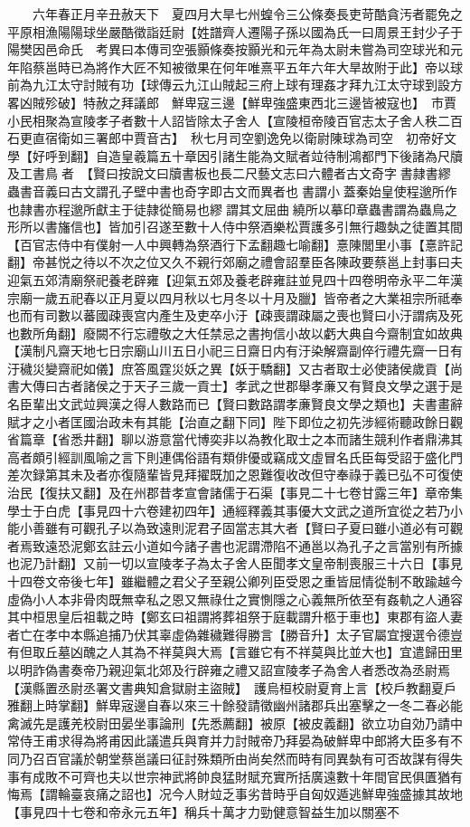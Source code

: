 　　六年春正月辛丑赦天下　夏四月大旱七州蝗令三公條奏長吏苛酷貪汚者罷免之平原相漁陽陽球坐嚴酷徵詣廷尉【姓譜齊人遷陽子孫以國為氏一曰周景王封少子于陽樊因邑命氏　考異曰本傳司空張顥條奏按顥光和元年為太尉未嘗為司空球光和元年陷蔡邕時已為將作大匠不知被徵果在何年唯熹平五年六年大旱故附于此】帝以球前為九江太守討賊有功【球傳云九江山賊起三府上球有理姦才拜九江太守球到設方畧凶賊殄破】特赦之拜議郎　鮮卑寇三邊【鮮卑強盛東西北三邊皆被寇也】　市賈小民相聚為宣陵孝子者數十人詔皆除太子舍人【宣陵桓帝陵百官志太子舍人秩二百石更直宿衛如三署郎中賈音古】　秋七月司空劉逸免以衛尉陳球為司空　初帝好文學【好呼到翻】自造皇羲篇五十章因引諸生能為文賦者竝待制鴻都門下後諸為尺牘及工書鳥者　【賢曰按說文曰牘書板也長二尺藝文志曰六體者古文奇字書隷書繆蟲書音義曰古文謂孔子壁中書也奇字即古文而異者也書謂小蓋秦始皇使程邈所作也隷書亦程邈所獻主于徒隷從簡易也繆謂其文屈曲繞所以摹印章蟲書謂為蟲鳥之形所以書旛信也】皆加引召遂至數十人侍中祭酒樂松賈護多引無行趣埶之徒置其間【百官志侍中有僕射一人中興轉為祭酒行下孟翻趣七喻翻】憙陳閭里小事【憙許記翻】帝甚悦之待以不次之位又久不親行郊廟之禮會詔羣臣各陳政要蔡邕上封事曰夫迎氣五郊清廟祭祀養老辟雍【迎氣五郊及養老辟雍註並見四十四卷明帝永平二年漢宗廟一歲五祀春以正月夏以四月秋以七月冬以十月及臘】皆帝者之大業祖宗所祗奉也而有司數以蕃國疎喪宫内產生及吏卒小汙【疎喪謂疎屬之喪也賢曰小汙謂病及死也數所角翻】廢闕不行忘禮敬之大任禁忌之書拘信小故以虧大典自今齋制宜如故典【漢制凡齋天地七日宗廟山川五日小祀三日齋日内有汙染解齋副倅行禮先齋一日有汙穢災變齋祀如儀】庶答風霆災妖之異【妖于驕翻】又古者取士必使諸侯歲貢【尚書大傳曰古者諸侯之于天子三歲一貢士】孝武之世郡舉孝亷又有賢良文學之選于是名臣輩出文武竝興漢之得人數路而已【賢曰數路謂孝亷賢良文學之類也】夫書畫辭賦才之小者匡國治政未有其能【治直之翻下同】陛下即位之初先涉經術聽政餘日觀省篇章【省悉井翻】聊以游意當代博奕非以為教化取士之本而諸生競利作者鼎沸其高者頗引經訓風喻之言下則連偶俗語有類俳優或竊成文虛冒名氏臣每受詔于盛化門差次録第其未及者亦復隨輩皆見拜擢既加之恩難復收改但守奉祿于義已弘不可復使治民【復扶又翻】及在州郡昔孝宣會諸儒于石渠【事見二十七卷甘露三年】章帝集學士于白虎【事見四十六卷建初四年】通經釋義其事優大文武之道所宜從之若乃小能小善雖有可觀孔子以為致遠則泥君子固當志其大者【賢曰子夏曰雖小道必有可觀者焉致遠恐泥鄭玄註云小道如今諸子書也泥謂滯陷不通邕以為孔子之言當别有所據也泥乃計翻】又前一切以宣陵孝子為太子舍人臣聞孝文皇帝制喪服三十六日【事見十四卷文帝後七年】雖繼體之君父子至親公卿列臣受恩之重皆屈情從制不敢踰越今虛偽小人本非骨肉既無幸私之恩又無祿仕之實惻隱之心義無所依至有姦軌之人通容其中桓思皇后祖載之時【鄭玄曰祖謂將葬祖祭于庭載謂升柩于車也】東郡有盜人妻者亡在孝中本縣追捕乃伏其辜虛偽雜穢難得勝言【勝音升】太子官屬宜搜選令德豈有但取丘墓凶醜之人其為不祥莫與大焉【言雖它有不祥莫與比並大也】宜遣歸田里以明詐偽書奏帝乃親迎氣北郊及行辟雍之禮又詔宣陵孝子為舍人者悉改為丞尉焉【漢縣置丞尉丞署文書典知倉獄尉主盜賊】　護烏桓校尉夏育上言【校戶教翻夏戶雅翻上時掌翻】鮮卑宼邊自春以來三十餘發請徵幽州諸郡兵出塞擊之一冬二春必能禽滅先是護羌校尉田晏坐事論刑【先悉薦翻】被原【被皮義翻】欲立功自効乃請中常侍王甫求得為將甫因此議遣兵與育并力討賊帝乃拜晏為破鮮卑中郎將大臣多有不同乃召百官議於朝堂蔡邕議曰征討殊類所由尚矣然而時有同異埶有可否故謀有得失事有成敗不可齊也夫以世宗神武將帥良猛財賦充實所括廣遠數十年間官民俱匱猶有悔焉【謂輪臺哀痛之詔也】况今人財竝乏事劣昔時乎自匈奴遁逃鮮卑強盛據其故地【事見四十七卷和帝永元五年】稱兵十萬才力勁健意智益生加以關塞不